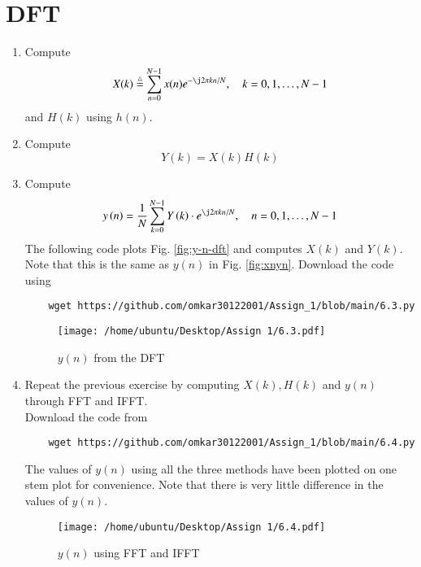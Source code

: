 \documentclass[journal,12pt,twocolumn]{IEEEtran}
\renewcommand\thesection{\arabic{section}}
\begin{document}
\section{DFT}
\begin{enumerate}[label=\thesection.\arabic*]
	\item
	Compute
	\begin{equation}
		X(k) \define \sum _{n=0}^{N-1}x(n) e^{-\j2\pi kn/N}, \quad k = 0,1,\dots, N-1
	\end{equation}
	and $H(k)$ using $h(n)$.
	\item Compute 
	\begin{equation}
		Y(k) = X(k)H(k)
		\label{eq:fp}
	\end{equation}
	\item Compute
	\begin{equation}
		y\brak{n}={\frac {1}{N}}\sum _{k=0}^{N-1}Y\brak{k}\cdot e^{\j 2\pi kn/N},\quad n = 0,1,\dots, N-1
		\label{eq:inv-ft}
	\end{equation}
	\solution The following code plots Fig. \eqref{fig:y-n-dft} and computes $X(k)$
	and $Y(k)$. Note that this is the same as $y(n)$ in Fig. \eqref{fig:xnyn}.
	Download the code using
	\begin{lstlisting}
	wget https://github.com/omkar30122001/Assign_1/blob/main/6.3.py
	\end{lstlisting}
	\begin{figure}[!ht]
		\centering
		\texttt{[image: /home/ubuntu/Desktop/Assign 1/6.3.pdf]}
		\caption{$y(n)$ from the DFT}
		\label{fig:y-n-dft}
	\end{figure}
	\item Repeat the previous exercise by computing $X(k), H(k)$ and $y(n)$ through FFT and 
	IFFT. \\
	\solution Download the code from \\
	\begin{lstlisting}
	wget https://github.com/omkar30122001/Assign_1/blob/main/6.4.py
	\end{lstlisting}
	The values of $y(n)$ using all the three methods have been plotted on one stem plot for convenience. Note that there is very little difference in the values of $y(n)$.
	\begin{figure}
		\centering
		\texttt{[image: /home/ubuntu/Desktop/Assign 1/6.4.pdf]}
		\caption{$y(n)$ using FFT and IFFT}
		\label{fig:y-n-fft}
	\end{figure}
%

\end{enumerate}
\end{document}

